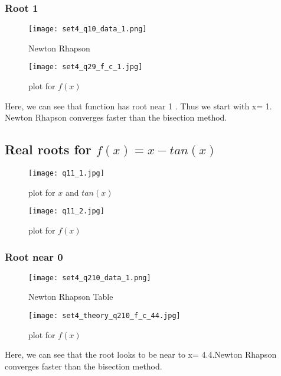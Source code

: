 \documentclass[a4paper]{article}
\begin{document}
        \subsubsection{Root 1}
           \begin{figure}[!htbp]
              \centering
              \begin{minipage}[b]{0.45\textwidth}
\texttt{[image: set4\_q10\_data\_1.png]}
                \caption{Newton Rhapson }
              \end{minipage}
              \hfill
              \begin{minipage}[b]{0.45\textwidth}
                \texttt{[image: set4\_q29\_f\_c\_1.jpg]}
                \caption{plot for $f(x)$}
              \end{minipage}
            \end{figure}
            \Large{Here, we can see that function has root near 1 . Thus we start with x= 1.\\Newton Rhapson converges faster than the bisection method.}
            \newpage
            
            \subsection{Real roots  for $f(x)=x-tan(x)$}
            \begin{figure}[!htbp]
              \centering
              \begin{minipage}[b]{0.45\textwidth}
                \texttt{[image: q11\_1.jpg]}
                \caption{plot for $x$ and $ tan(x)$ }
              \end{minipage}
              \hfill
              \begin{minipage}[b]{0.45\textwidth}
                \texttt{[image: q11\_2.jpg]}
                \caption{plot for $f(x)$}
              \end{minipage}
            \end{figure}
            
        \subsubsection{Root near 0}
        \begin{figure}[!htbp]
    \centering
      \begin{minipage}[b]{0.45\textwidth}
        \texttt{[image: set4\_q210\_data\_1.png]}
                \caption{Newton Rhapson Table }
              \end{minipage}
              \hfill
              \begin{minipage}[b]{0.45\textwidth}
                \texttt{[image: set4\_theory\_q210\_f\_c\_44.jpg]}
                \caption{plot for $f(x)$}
              \end{minipage}
            \end{figure}
            \large{Here, we can see that the root looks to be near to x= 4.4.Newton Rhapson converges faster than the bisection method.}
            \newpage
            
\end{document}
